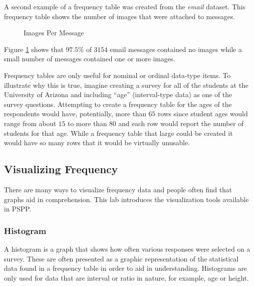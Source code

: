 A second example of a frequency table was created from the \textit{email} dataset. This frequency table shows the number of images that were attached to messages.

\begin{figure}[H]
  \begin{center}
    \caption{Images Per Message}
    \label{lab02_fig02}
  \end{center}
\end{figure}

Figure \ref{lab02_fig02} shows that $ 97.5\% $ of $ 3154 $ email messages contained no images while a small number of messages contained one or more images.

Frequency tables are only useful for nominal or ordinal data-type items. To illustrate why this is true, imagine creating a survey for all of the students at the University of Arizona and including ``age'' (interval-type data) as one of the survey questions. Attempting to create a frequency table for the ages of the respondents would have, potentially, more than $ 65 $ rows since student ages would range from about $ 15 $ to more than $ 80 $ and each row would report the number of students for that age. While a frequency table that large could be created it would have so many rows that it would be virtually unusable.

\subsection{Visualizing Frequency}

There are many ways to visualize frequency data and people often find that graphs aid in comprehension. This lab introduces the visualization tools available in \acs{PSPP}.

\subsubsection{Histogram}

A histogram is a graph that shows how often various responses were selected on a survey. These are often presented as a graphic representation of the statistical data found in a frequency table in order to aid in understanding. Histograms are only used for data that are interval or ratio in nature, for example, age or height. 

